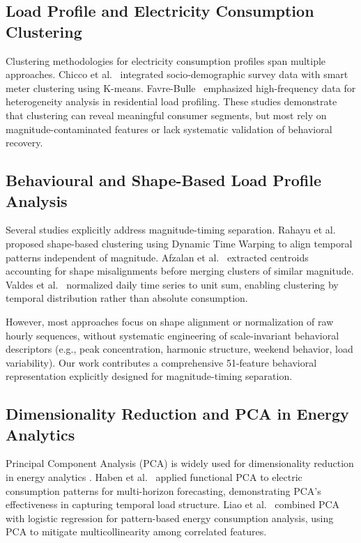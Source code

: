 \documentclass[11pt,a4paper]{article}
\begin{document}
\subsection{Load Profile and Electricity Consumption Clustering}

Clustering methodologies for electricity consumption profiles span multiple approaches. Chicco et al.~\cite{chicco2021clustering} integrated socio-demographic survey data with smart meter clustering using K-means. Favre-Bulle~\cite{favre-bulle2024clustering} emphasized high-frequency data for heterogeneity analysis in residential load profiling. These studies demonstrate that clustering can reveal meaningful consumer segments, but most rely on magnitude-contaminated features or lack systematic validation of behavioral recovery.

\subsection{Behavioural and Shape-Based Load Profile Analysis}

Several studies explicitly address magnitude-timing separation. Rahayu et al.~\cite{rahayu2021shape} proposed shape-based clustering using Dynamic Time Warping to align temporal patterns independent of magnitude. Afzalan et al.~\cite{afzalan2020twostage} extracted centroids accounting for shape misalignments before merging clusters of similar magnitude. Valdes et al.~\cite{valdes2021smart} normalized daily time series to unit sum, enabling clustering by temporal distribution rather than absolute consumption.

However, most approaches focus on shape alignment or normalization of raw hourly sequences, without systematic engineering of scale-invariant behavioral descriptors (e.g., peak concentration, harmonic structure, weekend behavior, load variability). Our work contributes a comprehensive 51-feature behavioral representation explicitly designed for magnitude-timing separation.

\subsection{Dimensionality Reduction and PCA in Energy Analytics}

Principal Component Analysis (PCA) is widely used for dimensionality reduction in energy analytics \cite{jolliffe2002pca}. Haben et al.~\cite{haben2019fpca} applied functional PCA to electric consumption patterns for multi-horizon forecasting, demonstrating PCA's effectiveness in capturing temporal load structure. Liao et al.~\cite{liao2016pattern} combined PCA with logistic regression for pattern-based energy consumption analysis, using PCA to mitigate multicollinearity among correlated features.
\end{document}
